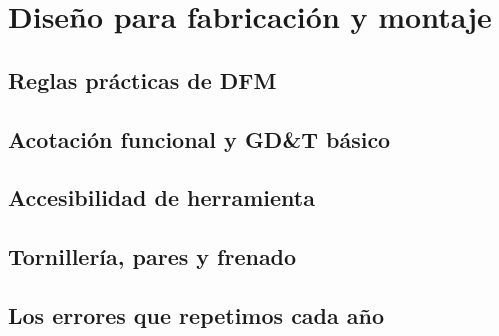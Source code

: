 \chapter{Diseño para fabricación y montaje}
\label{ch:dfm_dfa}

\begin{objetivos}
  \item {}
  \item {}
  \item {}
\end{objetivos}


\section{Reglas prácticas de DFM}
\label{sec:dfm_dfa:01}

\section{Acotación funcional y GD\&T básico}
\label{sec:dfm_dfa:02}

\section{Accesibilidad de herramienta}
\label{sec:dfm_dfa:03}

\section{Tornillería, pares y frenado}
\label{sec:dfm_dfa:04}

\section{Los errores que repetimos cada año}
\label{sec:dfm_dfa:05}


